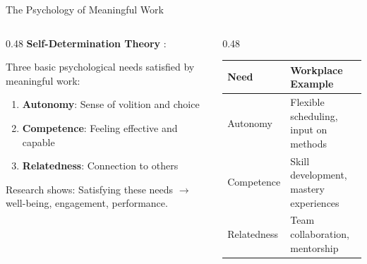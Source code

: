 ﻿\documentclass[aspectratio=169,11pt]{beamer}
\begin{document}
\begin{frame}{The Psychology of Meaningful Work}
\begin{columns}[T]
\begin{column}{0.48\textwidth}
\textbf{Self-Determination Theory} \parencite{ryan_deci_sdt}:

Three basic psychological needs satisfied by meaningful work:

\vspace{0.2em}
\begin{enumerate}
    \item \textbf{Autonomy}: Sense of volition and choice
    \item \textbf{Competence}: Feeling effective and capable
    \item \textbf{Relatedness}: Connection to others
\end{enumerate}

\vspace{0.2em}
Research shows: Satisfying these needs $\rightarrow$ well-being, engagement, performance.
\end{column}
\begin{column}{0.48\textwidth}
\begin{table}[h]
\centering
\scriptsize
\begin{tabular}{@{}p{1.8cm}p{3.5cm}@{}}
\toprule
\textbf{Need} & \textbf{Workplace Example} \\
\midrule
Autonomy & Flexible scheduling, input on methods \\
\addlinespace
Competence & Skill development, mastery experiences \\
\addlinespace
Relatedness & Team collaboration, mentorship \\
\bottomrule
\end{tabular}
\end{table}
\end{column}
\end{columns}
\end{frame}
\end{document}
